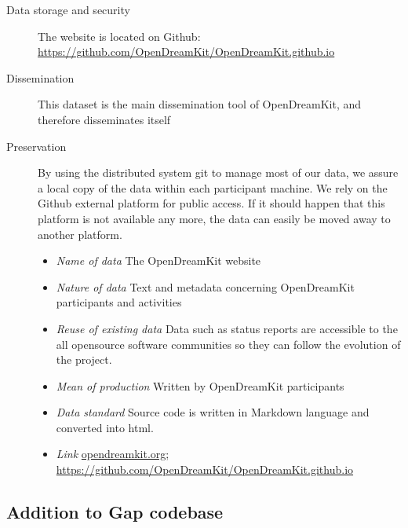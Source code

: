 \documentclass{../../Proposal/LaTeX-proposal/deliverablereport}
\begin{document}
\begin{description}
\item[Data storage and security] The website is located on Github: \href{https://github.com/OpenDreamKit/OpenDreamKit.github.io}{https://github.com/OpenDreamKit/OpenDreamKit.github.io}
\item[Dissemination] This dataset is the main dissemination tool of OpenDreamKit, and therefore disseminates itself
\item[Preservation] By using the distributed system git to manage most of our data, we assure a local copy of the data within each participant machine. We rely on the Github external platform for public access. If it should happen that this platform is not available any more, the data can easily be moved away to another platform.
\begin{itemize}
\item\textit{Name of data} The OpenDreamKit website
\item\textit{Nature of data} Text and metadata concerning OpenDreamKit participants and activities
\item\textit{Reuse of existing data} Data such as status reports are accessible to the all opensource software communities so they can follow the evolution of the project. 
\item\textit{Mean of production} Written by OpenDreamKit participants
\item\textit{Data standard} Source code is written in Markdown language and converted into html.
\item\textit{Link} \href{http://opendreamkit.org/}{opendreamkit.org}; \href{https://github.com/OpenDreamKit/OpenDreamKit.github.io}{https://github.com/OpenDreamKit/OpenDreamKit.github.io}
\end{itemize}
\end{description}


\subsection{Addition to Gap codebase}
\end{document}

